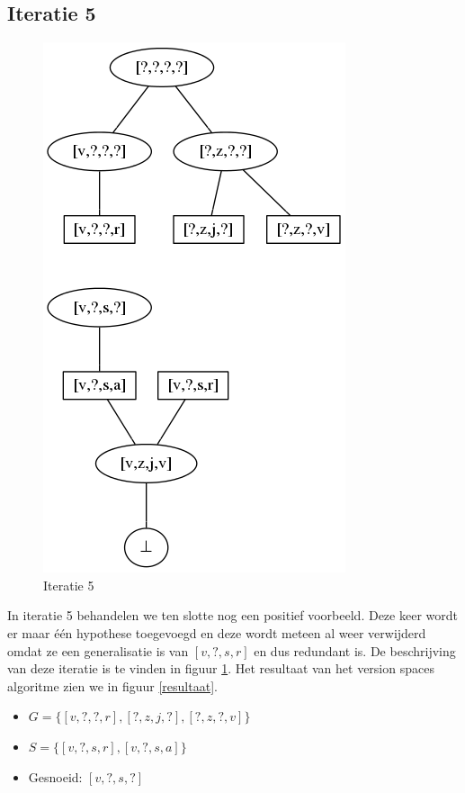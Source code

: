 \documentclass[alternative-exam.tex]{subfiles}
\begin{document}
\subsection{Iteratie 5}
\begin{figure}
[H]
\centering
\caption{Iteratie 5}
\label{iter_5}
\includegraphics[scale=0.5]{resources/graphs/iteration_5.png}
\end{figure}
In iteratie 5 behandelen we ten slotte nog een positief voorbeeld. Deze keer wordt er maar \'e\'en hypothese toegevoegd en deze wordt meteen al weer verwijderd omdat ze een generalisatie is van $[v,?,s,r]$ en dus redundant is. De beschrijving van deze iteratie is te vinden in figuur \ref{iter_5}. Het resultaat van het version spaces algoritme zien we in figuur \ref{resultaat}.
\begin{itemize}
\item $G = \{[v,?,?,r],[?,z,j,?],[?,z,?,v]\}$
\item $S = \{[v,?,s,r],[v,?,s,a]\}$
\item Gesnoeid: $[v,?,s,?]$
\end{itemize}
\end{document}
